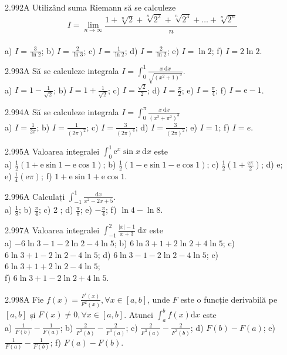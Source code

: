 \documentclass[11pt]{article}
\begin{document}
2.992A Utilizând suma Riemann să se calculeze $$I=\lim _{n \rightarrow \infty} \frac{1+\sqrt[n]{2}+\sqrt[n]{2^{2}}+\sqrt[n]{2^{3}}+\ldots+\sqrt[n]{2^{n}}}{n}$$\\ a) $I=\frac{3}{\ln 2}$; b) $I=\frac{2}{\ln 3}$; c) $I=\frac{1}{\ln 2}$; d) $I=\frac{2}{\ln 2}$; e) $I=\ln 2$; f) $I=2 \ln 2$.

2.993A Să se calculeze integrala $I=\int_{0}^{1} \frac{x \mathrm{~d} x}{\sqrt{\left(x^{2}+1\right)^{3}}}$.\\ a) $I=1-\frac{1}{\sqrt{2}}$; b) $I=1+\frac{1}{\sqrt{2}}$; c) $I=\frac{\sqrt{2}}{2}$; d) $I=\frac{\pi}{2}$; e) $I=\frac{\pi}{4}$; f) $I=\mathrm{e}-1$.

2.994A Să se calculeze integrala $I=\int_{0}^{\pi} \frac{x \mathrm{~d} x}{\left(x^{2}+\pi^{2}\right)^{3}}$\\ a) $I=\frac{1}{2 \pi}$; b) $I=\frac{1}{(2 \pi)^{2}}$; c) $I=\frac{3}{(2 \pi)^{4}}$; d) $I=\frac{3}{(2 \pi)^{2}}$; e) $I=1$; f) $I=e$.

2.995A Valoarea integralei $\int_{0}^{1} \mathrm{e}^{x} \sin x \mathrm{~d} x$ este\\ a) $\frac{1}{2}(1+\mathrm{e} \sin 1-\mathrm{e} \cos 1)$; b) $\frac{1}{2}(1-\mathrm{e} \sin 1-\mathrm{e} \cos 1)$; c) $\frac{1}{2}\left(1+\frac{\mathrm{e} \pi}{2}\right)$; d) $\mathrm{e}$;\\ e) $\frac{1}{4}(\mathrm{e} \pi)$; f) $1+\mathrm{e} \sin 1+\mathrm{e} \cos 1$.

2.996A Calculați $\int_{-1}^{1} \frac{\mathrm{d} x}{x^{2}-2 x+5}$.\\ a) $\frac{1}{8}$; b) $\frac{\pi}{4}$; c) 2 ; d) $\frac{\pi}{8}$; e) $-\frac{\pi}{4}$; f) $\ln 4-\ln 8$.

2.997A Valoarea integralei $\int_{-1}^{2} \frac{|x|-1}{x+3} \mathrm{~d} x$ este\\ a) $-6 \ln 3-1-2 \ln 2-4 \ln 5$; b) $6 \ln 3+1+2 \ln 2+4 \ln 5$; c) $6 \ln 3+1-2 \ln 2-4 \ln 5$; d) $6 \ln 3-1-2 \ln 2-4 \ln 5$; e) $6 \ln 3+1+2 \ln 2-4 \ln 5$;\\ f) $6 \ln 3+1-2 \ln 2+4 \ln 5$.

2.998A Fie $f(x)=\frac{F^{\prime}(x)}{F^{2}(x)}, \forall x \in[a, b]$, unde $F$ este o funcție derivabilă pe $[a, b]$ și $F(x) \neq 0, \forall x \in[a, b]$. Atunci $\int_{a}^{b} f(x) \mathrm{d} x$ este\\ a) $\frac{1}{F(b)}-\frac{1}{F(a)}$; b) $\frac{2}{F^{3}(b)}-\frac{2}{F^{3}(a)}$; c) $\frac{2}{F^{3}(a)}-\frac{2}{F^{3}(b)}$; d) $F(b)-F(a)$; e) $\frac{1}{F(a)}-\frac{1}{F(b)}$; f) $F(a)-F(b)$.
\end{document}
